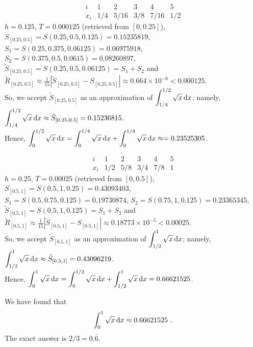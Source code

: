 \begin{egg}
\[
\begin{array}{c|ccccc}
i & 1 & 2 & 3 & 4 & 5 \\
\hline
x_i & 1/4 & 5/16 & 3/8 & 7/16 & 1/2
\end{array}
\]
$h=0.125$, $T=0.000125$ (retrieved from $[0,0.25]$),\\
$S_{[0.25,0.5]} = S(0.25, 0.5, 0.125) = 0.15235819$,\\
$S_1 = S(0.25, 0.375, 0.06125) = 0.06975918$,
$S_2 = S(0.375, 0.5, 0.0615) = 0.08260897$,\\
$\tilde{S}_{[0.25,0.5]} = S(0.25,0.5,0.06125) = S_1+S_2$ and\\
$\displaystyle \tilde{R}_{[0.25,0.5]} \approx \frac{1}{15}\left|
  \tilde{S}_{[0.25,0.5]} - S_{[0.25,0.5]}\right|
\approx 0.664 \times 10^{-6} < 0.000125$.\\
So, we accept $\tilde{S}_{[0.25,0.5]}$ as an
approximation of $\displaystyle \int_{1/4}^{1/2} \sqrt{x}\,\mathrm{d}x$;
namely,\\
$\displaystyle \int_{1/4}^{1/2} \sqrt{x}\,\mathrm{d}x \approx \tilde{S}_{[0.25,0.5]}
= 0.15236815$.\\
Hence,
$\displaystyle \int_0^{1/2} \sqrt{x}\,\mathrm{d}x =
\int_0^{1/4} \sqrt{x}\,\mathrm{d}x + \int_0^{1/4} \sqrt{x}\,\mathrm{d}x \approx = 0.23525305$.

\[
\begin{array}{c|ccccc}
i & 1 & 2 & 3 & 4 & 5 \\
\hline
x_i & 1/2 & 5/8 & 3/4 & 7/8 & 1
\end{array}
\]
$h=0.25$, $T=0.00025$ (retrieved from $[0,0.5]$),
$S_{[0.5,1]} = S(0.5,1,0.25) = 0.43093403$,\\
$S_1 = S(0.5, 0.75, 0.125) = 0.19730874$,
$S_2 = S(0.75, 1, 0.125) = 0.23365345$,\\
$\tilde{S}_{[0.5,1]} = S(0.5,1,0.125) = S_1+S_2$ and\\
$\displaystyle \tilde{R}_{[0.5,1]} \approx \frac{1}{15}\left|
\tilde{S}_{[0.5,1]} - S_{[0.5,1]}\right|
\approx 0.18773 \times 10^{-5} < 0.00025$.\\
So, we accept $\tilde{S}_{[0.5,1]}$ as an
approximation of $\displaystyle \int_{1/2}^{1} \sqrt{x}\,\mathrm{d}x$; namely,\\
$\displaystyle \int_{1/2}^{1} \sqrt{x}\,\mathrm{d}x \approx \tilde{S}_{[0.5,1]} = 
0.43096219$.\\
Hence,
$\displaystyle \int_0^1 \sqrt{x}\,\mathrm{d}x =
\int_0^{1/2} \sqrt{x}\,\mathrm{d}x + \int_{1/2}^1 \sqrt{x}\,\mathrm{d}x = 0.66621525$.

We have found that
\[
\int_0^{1} \sqrt{x}\,\mathrm{d}x \approx 0.66621525 \ .
\]
The exact answer is $2/3 = 0.\overline{6}$.
\end{egg}

